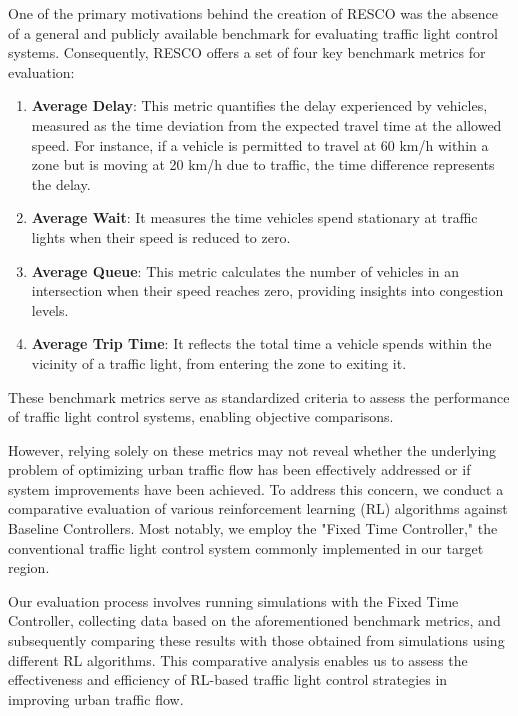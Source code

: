 One of the primary motivations behind the creation of RESCO was the absence of a general and publicly available benchmark for evaluating traffic light control systems. Consequently, RESCO offers a set of four key benchmark metrics for evaluation:

\begin{enumerate}
    \item \textbf{Average Delay}: This metric quantifies the delay experienced by vehicles, measured as the time deviation from the expected travel time at the allowed speed. For instance, if a vehicle is permitted to travel at 60 km/h within a zone but is moving at 20 km/h due to traffic, the time difference represents the delay.
    
    \item \textbf{Average Wait}: It measures the time vehicles spend stationary at traffic lights when their speed is reduced to zero.
    
    \item \textbf{Average Queue}: This metric calculates the number of vehicles in an intersection when their speed reaches zero, providing insights into congestion levels.
    
    \item \textbf{Average Trip Time}: It reflects the total time a vehicle spends within the vicinity of a traffic light, from entering the zone to exiting it.
\end{enumerate}

These benchmark metrics serve as standardized criteria to assess the performance of traffic light control systems, enabling objective comparisons.

However, relying solely on these metrics may not reveal whether the underlying problem of optimizing urban traffic flow has been effectively addressed or if system improvements have been achieved. To address this concern, we conduct a comparative evaluation of various reinforcement learning (RL) algorithms against Baseline Controllers. Most notably, we employ the "Fixed Time Controller," the conventional traffic light control system commonly implemented in our target region. 

Our evaluation process involves running simulations with the Fixed Time Controller, collecting data based on the aforementioned benchmark metrics, and subsequently comparing these results with those obtained from simulations using different RL algorithms. This comparative analysis enables us to assess the effectiveness and efficiency of RL-based traffic light control strategies in improving urban traffic flow.

